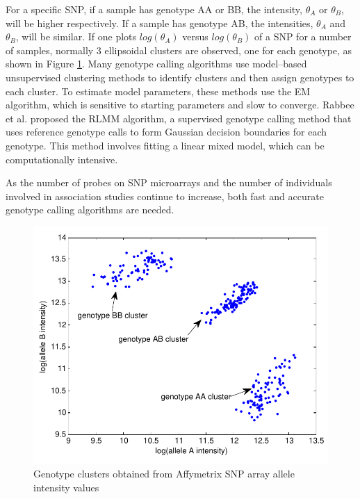 \documentclass{scrartcl}
\begin{document}
\par
For a specific SNP, if a sample has genotype AA or BB, the intensity,
$\theta_A$ or $\theta_B$, will be higher respectively. 
If a sample has genotype AB, the intensities, $\theta_A$ and $\theta_B$,
will be similar.
If one plots $log(\theta_A)$ versus $log(\theta_B)$ of a SNP for a number of
samples, normally 3 ellipsoidal clusters are observed, one for each genotype,
as shown in Figure \ref{fig:intro_genclus}.
Many genotype calling algorithms use model--based unsupervised clustering
methods to identify clusters and then assign genotypes to each cluster.
To estimate model parameters, these methods use the EM algorithm, which is
sensitive to starting parameters and slow to converge.
Rabbee et al. proposed the RLMM algorithm, a supervised genotype calling
method that uses reference genotype calls to form Gaussian decision
boundaries for each genotype.
This method involves fitting a linear mixed model, which can be computationally
intensive.

\par
As the number of probes on SNP microarrays and the number of individuals involved
in association studies continue to increase, both fast and accurate genotype
calling algorithms are needed.

\begin{figure}[H]
\centering
\includegraphics[scale=0.75]{intro_figs/intro_genotype_clusters.pdf}
\caption{Genotype clusters obtained from Affymetrix SNP array
allele intensity values}
\label{fig:intro_genclus}
\end{figure}
\end{document}
